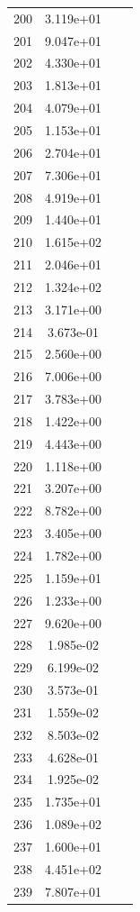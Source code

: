 \documentclass[12pt]{article}
\begin{document}
\begin{longtable}{@{}cccc@{}}
200 & 3.119e+01 &  &  \\
201 & 9.047e+01 &  &  \\
202 & 4.330e+01 &  &  \\
203 & 1.813e+01 &  &  \\
204 & 4.079e+01 &  &  \\
205 & 1.153e+01 &  &  \\
206 & 2.704e+01 &  &  \\
207 & 7.306e+01 &  &  \\
208 & 4.919e+01 &  &  \\
209 & 1.440e+01 &  &  \\
210 & 1.615e+02 &  &  \\
211 & 2.046e+01 &  &  \\
212 & 1.324e+02 &  &  \\
213 & 3.171e+00 &  &  \\
214 & 3.673e-01 &  &  \\
215 & 2.560e+00 &  &  \\
216 & 7.006e+00 &  &  \\
217 & 3.783e+00 &  &  \\
218 & 1.422e+00 &  &  \\
219 & 4.443e+00 &  &  \\
220 & 1.118e+00 &  &  \\
221 & 3.207e+00 &  &  \\
222 & 8.782e+00 &  &  \\
223 & 3.405e+00 &  &  \\
224 & 1.782e+00 &  &  \\
225 & 1.159e+01 &  &  \\
226 & 1.233e+00 &  &  \\
227 & 9.620e+00 &  &  \\
228 & 1.985e-02 &  &  \\
229 & 6.199e-02 &  &  \\
230 & 3.573e-01 &  &  \\
231 & 1.559e-02 &  &  \\
232 & 8.503e-02 &  &  \\
233 & 4.628e-01 &  &  \\
234 & 1.925e-02 &  &  \\
235 & 1.735e+01 &  &  \\
236 & 1.089e+02 &  &  \\
237 & 1.600e+01 &  &  \\
238 & 4.451e+02 &  &  \\
239 & 7.807e+01 &  &  \\

\end{longtable}
\end{document}
